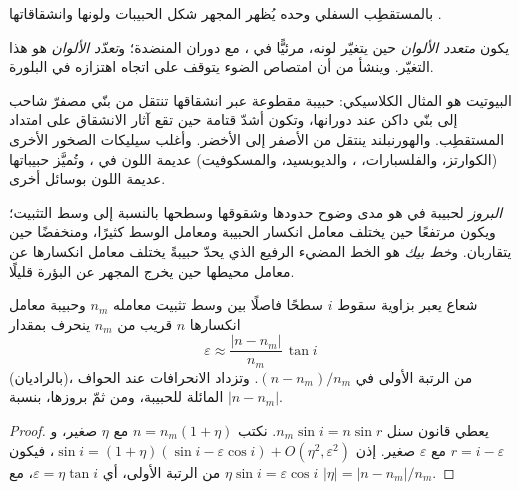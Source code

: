 بالمستقطِب السفلي وحده يُظهر المجهر شكل الحبيبات ولونها وانشقاقاتها .

\begin{definition}\label{def:b1:optical-mineralogy:pleochroism}
يكون  \emph{متعدد الألوان} حين يتغيّر لونه، مرئيًّا في ، مع دوران المنضدة؛ و\emph{تعدّد الألوان} هو هذا التغيّر. وينشأ من أن امتصاص الضوء يتوقف على اتجاه اهتزازه في البلورة.
\end{definition}

البيوتيت هو المثال الكلاسيكي: حبيبة مقطوعة عبر انشقاقها تنتقل من بنّي مصفرّ شاحب إلى بنّي داكن عند دورانها، وتكون أشدّ قتامة حين تقع آثار الانشقاق على امتداد المستقطِب. والهورنبلند ينتقل من الأصفر إلى الأخضر. وأغلب سيليكات الصخور الأخرى (الكوارتز، والفلسبارات، ، والديوبسيد، والمسكوفيت) عديمة اللون في ، وتُميَّز حبيباتها عديمة اللون بوسائل أخرى.

\begin{definition}\label{def:b1:optical-mineralogy:relief}
\emph{البروز} لحبيبة في  هو مدى وضوح حدودها وشقوقها وسطحها بالنسبة إلى وسط التثبيت؛ ويكون مرتفعًا حين يختلف معامل انكسار الحبيبة ومعامل الوسط كثيرًا، ومنخفضًا حين يتقاربان. و\emph{خط بيك} هو الخط المضيء الرفيع الذي يحدّ حبيبةً يختلف معامل انكسارها عن معامل محيطها حين يخرج المجهر عن البؤرة قليلًا.
\end{definition}

\begin{proposition}\label{prop:b1:optical-mineralogy:relief}
شعاع يعبر بزاوية سقوط $i$ سطحًا فاصلًا بين وسط تثبيت معامله $n_m$ وحبيبة معامل انكسارها $n$ قريب من $n_m$ ينحرف بمقدار
\[
  \varepsilon \approx \frac{|n - n_m|}{n_m}\,\tan i
\]
(بالراديان)، من الرتبة الأولى في $(n - n_m)/n_m$. وتزداد الانحرافات عند الحواف المائلة للحبيبة، ومن ثمّ بروزها، بنسبة $|n - n_m|$.
\end{proposition}

\begin{proof}
يعطي قانون سنل $n_m \sin i = n \sin r$. نكتب $n = n_m(1 + \eta)$ مع $\eta$ صغير، و$r = i - \varepsilon$ مع $\varepsilon$ صغير. إذن
$\sin i = (1 + \eta)(\sin i - \varepsilon\cos i) + O(\eta^2, \varepsilon^2)$،
فيكون $\eta \sin i = \varepsilon\cos i$ من الرتبة الأولى، أي
$\varepsilon = \eta\tan i$، مع $|\eta| = |n - n_m|/n_m$.
\end{proof}

